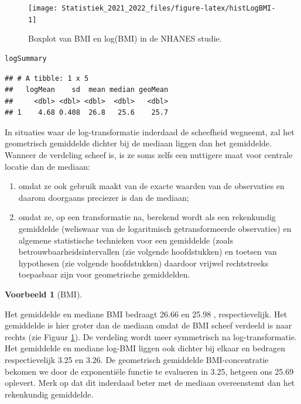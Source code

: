 \documentclass[
  12pt,dutch,coursenotes]{book}
\theoremstyle{definition}
\theoremstyle{definition}
\newtheorem{example}{Voorbeeld}[chapter]
\theoremstyle{definition}
\theoremstyle{definition}
\theoremstyle{remark}
\begin{document}
\begin{figure}

{\centering \texttt{[image: Statistiek\_2021\_2022\_files/figure-latex/histLogBMI-1]} 

}

\caption{Boxplot van BMI en log(BMI) in de NHANES studie.}\label{fig:histLogBMI}
\end{figure}

\begin{lstlisting}[language=R]
logSummary
\end{lstlisting}

\begin{lstlisting}
## # A tibble: 1 x 5
##   logMean    sd  mean median geoMean
##     <dbl> <dbl> <dbl>  <dbl>   <dbl>
## 1    4.68 0.408  26.8   25.6    25.7
\end{lstlisting}

In situaties waar de log-transformatie inderdaad de scheefheid wegneemt, zal
het geometrisch gemiddelde dichter bij de mediaan liggen dan het gemiddelde.
Wanneer de verdeling scheef is, is ze soms zelfs een nuttigere maat voor centrale
locatie dan de mediaan:

\begin{enumerate}
\def\labelenumi{\arabic{enumi}.}
\item
  omdat ze ook gebruik maakt van de exacte waarden van de observaties en
  daarom doorgaans preciezer is dan de mediaan;
\item
  omdat ze, op een transformatie na, berekend wordt als een rekenkundig
  gemiddelde (weliswaar van de logaritmisch getransformeerde observaties) en
  algemene statistische technieken voor een gemiddelde (zoals
  betrouwbaarheidsintervallen (zie volgende hoofdstukken) en toetsen van hypothesen (zie volgende hoofdstukken) daardoor vrijwel rechtstreeks
  toepasbaar zijn voor geometrische gemiddelden.
\end{enumerate}

\begin{example}[BMI]
\protect\hypertarget{exm:unnamed-chunk-100}{}{\label{exm:unnamed-chunk-100} {} }
\end{example}
Het gemiddelde en mediane BMI bedraagt 26.66 en 25.98 , respectievelijk. Het gemiddelde is hier groter dan de mediaan omdat de BMI scheef verdeeld is naar rechts (zie Figuur \ref{fig:histLogBMI}). De verdeling wordt meer symmetrisch na log-transformatie. Het gemiddelde en mediane log-BMI liggen ook dichter bij elkaar en bedragen respectievelijk 3.25 en 3.26. De geometrisch gemiddelde BMI-concentratie bekomen we door de exponentiële functie te evalueren in 3.25, hetgeen ons 25.69 oplevert. Merk op dat dit inderdaad beter met de mediaan overeenstemt dan het rekenkundig gemiddelde.
\end{document}
